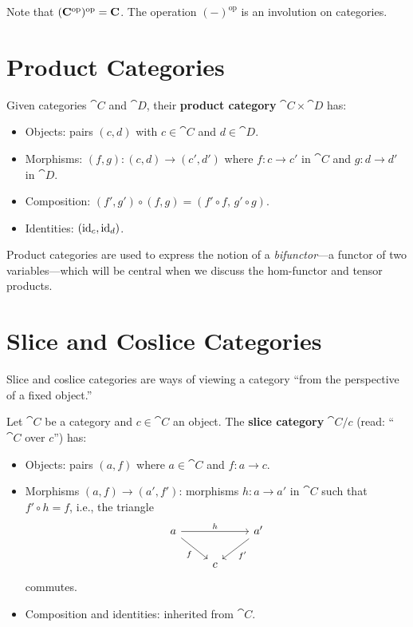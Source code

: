 \begin{remark}
Note that $(\mathbf{C}^{\mathrm{op}})^{\mathrm{op}} = \mathbf{C}$. The operation $(-)^\mathrm{op}$ is an involution on categories.
\end{remark}

\section{Product Categories}

\begin{definition}
Given categories $\cat{C}$ and $\cat{D}$, their \textbf{product category} $\cat{C} \times \cat{D}$ has:
\begin{itemize}
  \item Objects: pairs $(c, d)$ with $c \in \cat{C}$ and $d \in \cat{D}$.
  \item Morphisms: $(f,g): (c,d) \to (c',d')$ where $f: c \to c'$ in $\cat{C}$ and $g: d \to d'$ in $\cat{D}$.
  \item Composition: $(f', g') \circ (f, g) = (f' \circ f,\, g' \circ g)$.
  \item Identities: $(\mathrm{id}_c, \mathrm{id}_d)$.
\end{itemize}
\end{definition}

Product categories are used to express the notion of a \emph{bifunctor}—a functor of two variables—which will be central when we discuss the hom-functor and tensor products.

\section{Slice and Coslice Categories}

Slice and coslice categories are ways of viewing a category ``from the perspective of a fixed object.''

\begin{definition}
Let $\cat{C}$ be a category and $c \in \cat{C}$ an object. The \textbf{slice category} $\cat{C}/c$ (read: ``$\cat{C}$ over $c$'') has:
\begin{itemize}
  \item Objects: pairs $(a, f)$ where $a \in \cat{C}$ and $f: a \to c$.
  \item Morphisms $(a, f) \to (a', f')$: morphisms $h: a \to a'$ in $\cat{C}$ such that $f' \circ h = f$, i.e., the triangle
  \[
    \begin{tikzcd}
      a \arrow[rr, "h"] \arrow[dr, "f"'] & & a' \arrow[dl, "f'"] \\
      & c &
    \end{tikzcd}
  \]
  commutes.
  \item Composition and identities: inherited from $\cat{C}$.
\end{itemize}
\end{definition}

